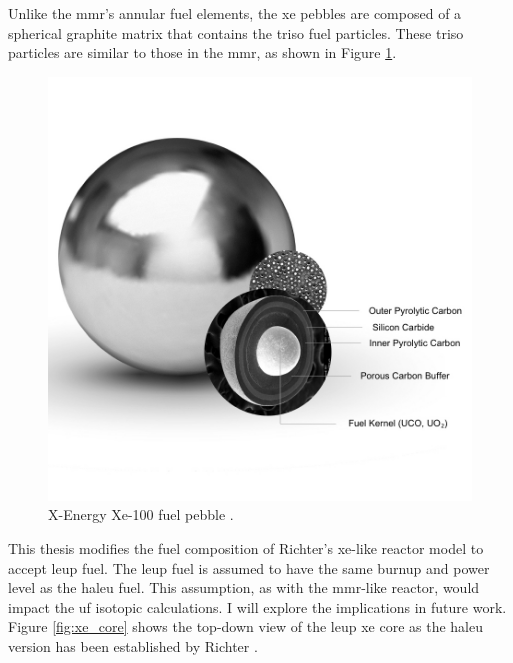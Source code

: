 Unlike the \gls{mmr}'s annular fuel elements, the \gls{xe} pebbles are composed of a spherical graphite matrix that contains the \gls{triso} fuel particles. These \gls{triso} particles are similar to those in the \gls{mmr}, as shown in Figure \ref{fig:xe_fuel}.

\begin{figure}[H]
    \centering
    \includegraphics[scale=0.28]{images/reactor_design/graphic-triso-x-pebble.jpg}
    \caption{X-Energy Xe-100 fuel pebble \cite{xe_fuel}.}
    \label{fig:xe_fuel}
\end{figure}


This thesis modifies the fuel composition of Richter's \gls{xe}-like reactor model to accept \gls{leup} fuel. The \gls{leup} fuel is assumed to have the same burnup and power level as the \gls{haleu} fuel. This assumption, as with the \gls{mmr}-like reactor, would impact the \gls{uf} isotopic calculations. I will explore the implications in future work. Figure \ref{fig:xe_core} shows the top-down view of the \gls{leup} \gls{xe} core as the \gls{haleu} version has been established by Richter \cite{richter_thesis_2022}.

